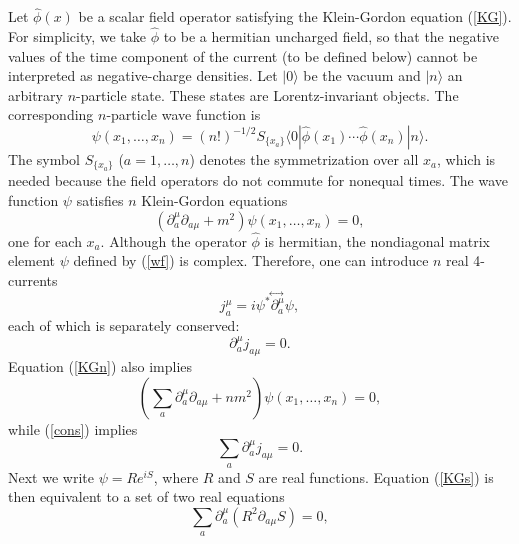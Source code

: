 \documentclass[12pt]{article}
\begin{document}
Let $\hat{\phi}(x)$ be a scalar field operator satisfying 
the Klein-Gordon equation (\ref{KG}).
For simplicity, we take $\hat{\phi}$ to be a hermitian uncharged field, 
so that 
the negative values of the time component of the current (to be defined
below) 
cannot be interpreted as negative-charge densities.
Let $|0\rangle$ be the vacuum and $|n\rangle$ an arbitrary 
$n$-particle state. These states are Lorentz-invariant objects.
The corresponding $n$-particle wave function is \cite{schweber,nikoldbb1}
\begin{equation}\label{wf}
\psi(x_1,\ldots ,x_n)=(n!)^{-1/2}S_{\{ x_a\} }
\langle 0|\hat{\phi}(x_1)\cdots\hat{\phi}(x_n)|n\rangle .
\end{equation}
The symbol $S_{\{ x_a\} }$ ($a=1,\ldots ,n$) 
denotes the symmetrization over all $x_a$, 
which is needed because the field operators do not commute 
for nonequal times.
The wave function $\psi$ satisfies $n$ Klein-Gordon equations
\begin{equation}\label{KGn}
(\partial_a^{\mu}\partial_{a\mu}+m^2)\psi(x_1,\ldots ,x_n)=0 ,
\end{equation}
one for each $x_a$.
Although the operator $\hat{\phi}$ is hermitian, the nondiagonal
matrix element $\psi$ defined by (\ref{wf}) is complex.
Therefore,
one can introduce $n$ real 4-currents
\begin{equation}\label{curn}
j^{\mu}_a=i\psi^* \!\stackrel{\leftrightarrow\;}{\partial^{\mu}_a}\! \psi ,
\end{equation}
each of which is separately conserved:
\begin{equation}\label{cons}
\partial^{\mu}_a j_{a\mu}=0.
\end{equation}
Equation (\ref{KGn}) also implies  
\begin{equation}\label{KGs}
\left( \sum_a\partial_a^{\mu}\partial_{a\mu}+nm^2 \right)
\psi(x_1,\ldots ,x_n)=0 ,
\end{equation}
while (\ref{cons}) implies
\begin{equation}\label{conss}
\sum_a\partial^{\mu}_a j_{a\mu}=0.
\end{equation}
Next we write $\psi=Re^{iS}$, where $R$ and $S$ are real
functions. Equation (\ref{KGs}) 
is then equivalent to a set of two real equations
\begin{equation}\label{cont}
\sum_a\partial_a^{\mu}(R^2\partial_{a\mu}S)=0,
\end{equation}
\end{document}
